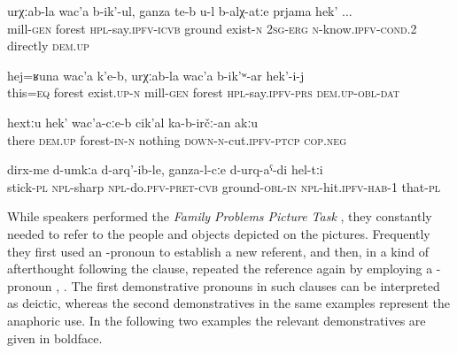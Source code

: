 \begin{exe}
	\ex
	\begin{xlist}
		\ex	\label{There is the forest that is called the mill’s forest, the ground, if you know it directly}
		\gll	urχːab-la	wac'a	b-ik'-ul,	ganza	te-b	u-l	b-alχ-atːe	prjama	hek' ...\\
			mill-\textsc{gen}	forest	\textsc{hpl}-say.\textsc{ipfv}-\textsc{icvb}	ground	exist-\textsc{n}	\textsc{2sg}-\textsc{erg}	\textsc{n}-know.\textsc{ipfv}-\textsc{cond}.2	directly	\textsc{dem.up}\\
		\glt	{}

		\ex	\label{A forest like this exists there, the mill’s forest it is called}
		\gll	hej=ʁuna	wac'a	k'e-b,	urχːab-la	wac'a	b-ik'ʷ-ar	hek'-i-j  \\
			this=\textsc{eq}	forest	exist.\textsc{up}-\textsc{n}	mill-\textsc{gen}	forest	\textsc{hpl}-say.\textsc{ipfv}-\textsc{prs}	\textsc{dem.up}-\textsc{obl}-\textsc{dat}\\
		\glt	{}

		\ex	\label{There in the forest nothing should be cut}
		\gll	hextːu		hek'	wac'a-cːe-b	cik'al	ka-b-irčː-an akːu  \\
			there		\textsc{dem.up}	forest-\textsc{in-n}	nothing	\textsc{down-n}-cut.\textsc{ipfv}-\textsc{ptcp} \textsc{cop.neg}\\
		\glt	{}
	\end{xlist}

		\label{We made sticks and hit them into the ground}
	\sn
	\gll	dirx-me	d-umkːa	d-arq'-ib-le,	ganza-l-cːe	d-urq-aˁ-di	hel-tːi\\
		stick-\textsc{pl}	\textsc{npl}-sharp	\textsc{npl}-do.\textsc{pfv}-\textsc{pret}-\textsc{cvb}	ground-\textsc{obl-in}	\textsc{npl}-hit.\textsc{ipfv}-\textsc{hab}-1	that-\textsc{pl} \\
	\glt	{}
\end{exe}

While speakers performed the \textit{Family Problems Picture Task} \citep{SanRoqueEtAl2012}, they constantly needed to refer to the people and objects depicted on the pictures. Frequently they first used an -pronoun to establish a new referent, and then, in a kind of afterthought following the clause, repeated the reference again by employing a -pronoun , . The first demonstrative pronouns in such clauses can be interpreted as deictic, whereas the second demonstratives in the same examples represent the anaphoric use. In the following two examples the relevant demonstratives are given in boldface.

